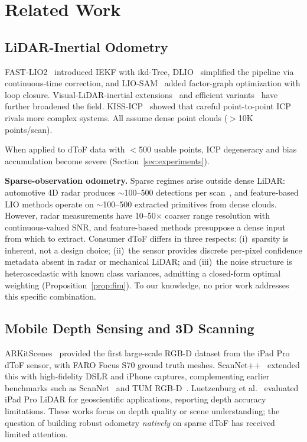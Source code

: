 \documentclass[journal]{IEEEtran}
\begin{document}
\section{Related Work}
\label{sec:related}

\subsection{LiDAR-Inertial Odometry}

FAST-LIO2~\cite{xu2022fastlio2} introduced IEKF with ikd-Tree, DLIO~\cite{chen2023dlio} simplified the pipeline via continuous-time correction, and LIO-SAM~\cite{shan2020liosam} added factor-graph optimization with loop closure. Visual-LiDAR-inertial extensions~\cite{zheng2024fastlivo2,lin2022r3live} and efficient variants~\cite{bai2022faster} have further broadened the field. KISS-ICP~\cite{vizzo2023kiss} showed that careful point-to-point ICP rivals more complex systems. All assume dense point clouds ($>$10K points/scan).

When applied to dToF data with $<$500 usable points, ICP degeneracy and bias accumulation become severe (Section~\ref{sec:experiments}).

\textbf{Sparse-observation odometry.} Sparse regimes arise outside dense LiDAR: automotive 4D radar produces ${\sim}$100--500 detections per scan~\cite{zhang2023radar,zhuang2023iriom,michalczyk2022rio}, and feature-based LIO methods operate on ${\sim}$100--500 extracted primitives from dense clouds. However, radar measurements have 10--50$\times$ coarser range resolution with continuous-valued SNR, and feature-based methods presuppose a dense input from which to extract. Consumer dToF differs in three respects: (i)~sparsity is inherent, not a design choice; (ii)~the sensor provides discrete per-pixel confidence metadata absent in radar or mechanical LiDAR; and (iii)~the noise structure is heteroscedastic with known class variances, admitting a closed-form optimal weighting (Proposition~\ref{prop:fim}). To our knowledge, no prior work addresses this specific combination.

\subsection{Mobile Depth Sensing and 3D Scanning}

ARKitScenes~\cite{baruch2021arkitscenes} provided the first large-scale RGB-D dataset from the iPad Pro dToF sensor, with FARO Focus S70 ground truth meshes. ScanNet++~\cite{yeshwanth2023scannetpp} extended this with high-fidelity DSLR and iPhone captures, complementing earlier benchmarks such as ScanNet~\cite{dai2017scannet} and TUM RGB-D~\cite{sturm2012benchmark}. Luetzenburg et al.~\cite{luetzenburg2021evaluation} evaluated iPad Pro LiDAR for geoscientific applications, reporting depth accuracy limitations. These works focus on depth quality or scene understanding; the question of building robust odometry \emph{natively} on sparse dToF has received limited attention.
\end{document}
